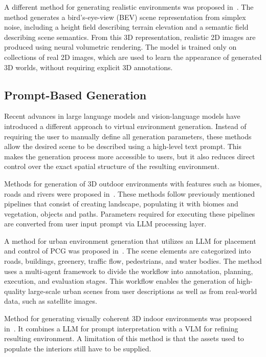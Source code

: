 A different method for generating realistic environments was proposed in~\cite{bk_scene_dreamer}. The method generates a bird's-eye-view (\ac{BEV}) scene representation from simplex noise, including a height field describing terrain elevation and a semantic field describing scene semantics. From this 3D representation, realistic 2D images are produced using neural volumetric rendering. The model is trained only on collections of real 2D images, which are used to learn the appearance of generated 3D worlds, without requiring explicit 3D annotations.

\subsection{Prompt-Based Generation}

Recent advances in large language models and vision-language models have introduced a different approach to virtual environment generation. Instead of requiring the user to manually define all generation parameters, these methods allow the desired scene to be described using a high-level text prompt. This makes the generation process more accessible to users, but it also reduces direct control over the exact spatial structure of the resulting environment.

Methods for generation of 3D outdoor environments with features such as biomes, roads and rivers were proposed in~\cite{bk_procedural_content_generation,bk_controllable_procedural_generation}. These methods follow previously mentioned pipelines that consist of creating landscape, populating it with biomes and vegetation, objects and paths. Parameters required for executing these pipelines are converted from user input prompt via \ac{LLM} processing layer.

A method for urban environment generation that utilizes an \ac{LLM} for placement and control of \ac{PCG} was proposed in~\cite{bk_city_x}. The scene elements are categorized into roads, buildings, greenery, traffic flow, pedestrians, and water bodies. The method uses a multi-agent framework to divide the workflow into annotation, planning, execution, and evaluation stages. This workflow enables the generation of high-quality large-scale urban scenes from user descriptions as well as from real-world data, such as satellite images.

Method for generating visually coherent 3D indoor environments was proposed in~\cite{bk_3d_generalist}. It combines a \ac{LLM} for prompt interpretation with a \ac{VLM} for refining resulting environment. A limitation of this method is that the assets used to populate the interiors still have to be supplied.

